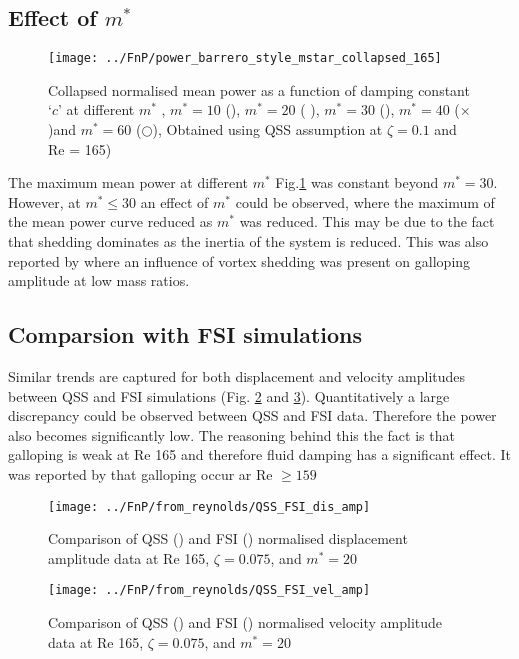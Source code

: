  



\subsection{Effect of $m^*$}

\begin{figure}
\centering
\texttt{[image: ../FnP/power\_barrero\_style\_mstar\_collapsed\_165]}
\caption{Collapsed normalised mean power as a function of damping constant `$c$' at different $m^*$  ,  $m^*=10$ (), $m^*=20$ ( ),  $m^*=30$ (),  $m^*=40$  ($\times$)and   $m^* = 60$ ($\bigcirc$), Obtained using QSS assumption at  $\zeta=0.1$ and Re = 165) } 
\label{fig:power_mstar_collapsed_165}
\end{figure}

The maximum mean power at different  $m^*$ Fig.\ref{fig:power_mstar_collapsed_165} was constant beyond $m^*=30$. However, at $m^* \leq 30$ an effect of $m^*$ could be observed, where the maximum of the mean power curve reduced as $m^*$ was reduced. This may be due to the fact that shedding dominates as the inertia of the system is reduced. This was also reported by \cite{Joly2012} where an influence of vortex shedding was present on galloping amplitude at low mass ratios. 


\subsection{Comparsion with FSI simulations}
 Similar trends are captured for both displacement and velocity amplitudes between QSS and FSI simulations (Fig. \ref{fig:QSS_FSI_dis_amp} and \ref{fig:QSS_FSI_vel_amp}). Quantitatively a large discrepancy  could be observed between QSS and FSI data. Therefore the power also becomes significantly low. The reasoning behind this the fact is that galloping is weak at Re 165 and therefore fluid damping has a significant effect. It was reported by \cite{Barrero-Gil2009} that galloping occur ar Re $\geq 159$
 
\begin{figure}[h!]
\centering
\texttt{[image: ../FnP/from\_reynolds/QSS\_FSI\_dis\_amp]}
\caption{Comparison of QSS ()  and FSI ()  normalised displacement amplitude data at Re 165, $\zeta=0.075$, and $m^*=20$}
\label{fig:QSS_FSI_dis_amp}
\end{figure}

\begin{figure}[h]
\centering
\texttt{[image: ../FnP/from\_reynolds/QSS\_FSI\_vel\_amp]}
\caption{Comparison of QSS ()  and FSI ()  normalised velocity amplitude data at Re 165, $\zeta=0.075$, and $m^*=20$}
\label{fig:QSS_FSI_vel_amp}
\end{figure}

